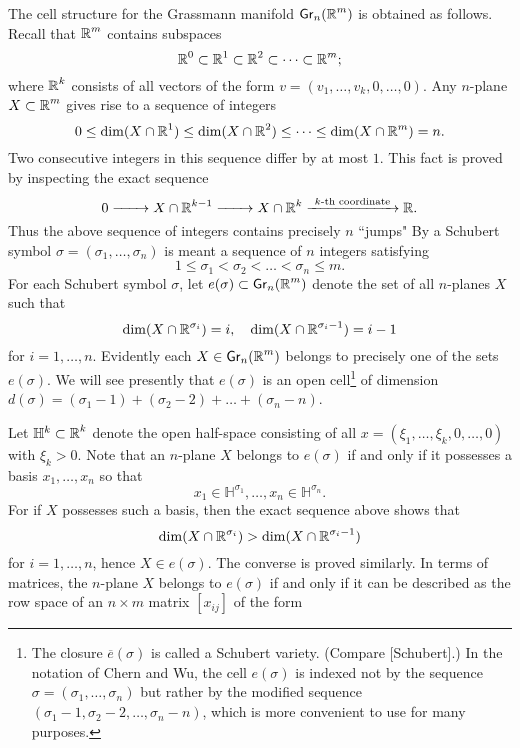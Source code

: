 The cell structure for the Grassmann manifold $\grass{n}{m}$ is obtained as follows. Recall that $\boldsymbol{\mathbb{R}}^m$ contains subspaces
\[
\boldsymbol{\mathbb{R}}^{0} \subset \boldsymbol{\mathbb{R}}^{1} \subset \boldsymbol{\mathbb{R}}^{2} \subset\dots \subset \boldsymbol{\mathbb{R}}^m;
\]
where $\boldsymbol{\mathbb{R}}^{k}$ consists of all vectors of the form $v=(v_{1},\dots, v_{k}, 0,\dots, 0)$. Any $n$-plane $X \subset \boldsymbol{\mathbb{R}}^m$ gives rise to a sequence of integers
\[
0 \leq \dim(X \cap \boldsymbol{\mathbb{R}}^{1}) \leq \dim(X \cap \boldsymbol{\mathbb{R}}^{2}) \leq\dots \leq \dim(X \cap \boldsymbol{\mathbb{R}}^m)=n.
\]
Two consecutive integers in this sequence differ by at most $1$. This fact is proved by inspecting the exact sequence
\[
0 \xrightarrow{\qquad}X \cap \boldsymbol{\mathbb{R}}^{k-1} \xrightarrow{\qquad}X \cap \boldsymbol{\mathbb{R}}^{k}\xrightarrow{\ k\text{-th coordinate }}  \boldsymbol{\mathbb{R}}.
\]
Thus the above sequence of integers contains precisely $n$ ``jumps" By a Schubert symbol $\sigma=(\sigma_{1},\dots, \sigma_{n})$ is meant a sequence of $n$ integers satisfying
\[
1 \leq \sigma_{1}<\sigma_{2}<\dots<\sigma_{n} \leq m.
\]
For each Schubert symbol $\sigma$, let $e(\sigma) \subset \grass{n}{m}$ denote the set of all $n$-planes $X$ such that
\[
\dim(X \cap \boldsymbol{\mathbb{R}}^{\sigma_{i}})=i,\quad \dim(X \cap \boldsymbol{\mathbb{R}}^{\sigma_{i}-1})=i-1
\]
for $i=1,\dots, n$. Evidently each $X \in \grass{n}{m}$ belongs to precisely one of the sets  $e(\sigma)$. We will see presently that $e(\sigma)$ is an open cell\footnote{The closure $\overline{e}(\sigma)$ is called a Schubert variety. (Compare [Schubert].) In the notation of Chern and Wu, the cell $e(\sigma)$ is indexed not by the sequence $\sigma=(\sigma_{1},\dots, \sigma_{n})$ but rather by the modified sequence $(\sigma_{1}-1, \sigma_{2}-2,\dots, \sigma_{n}-n)$, which is more convenient to use for many purposes.} of dimension $d(\sigma)=(\sigma_{1}-1)+(\sigma_{2}-2)+\dots+(\sigma_{n}-n)$.

Let $\mathbb{H}^{k} \subset \boldsymbol{\mathbb{R}}^{k}$ denote the open half-space consisting of all $x= (\xi_{1},\dots, \xi_{k}, 0,\dots, 0)$ with $\xi_{k}>0 $. Note that an $n$-plane $X$ belongs to $e(\sigma)$ if and only if it possesses a basis $x_{1},\dots, x_{n}$ so that
\[
x_{1} \in \mathbb{H}^{\sigma_{1}},\dots, x_{n} \in \mathbb{H}^{\sigma_{n}}.
\]
For if $X$ possesses such a basis, then the exact sequence above shows that
\[
\dim(X \cap \boldsymbol{\mathbb{R}}^{\sigma_{i}})>\dim(X \cap \boldsymbol{\mathbb{R}}^{\sigma_{i}-1})
\]
for $i=1,\dots, n$, hence $X \in e(\sigma) $. The converse is proved similarly. In terms of matrices, the $n$-plane $X$ belongs to $e(\sigma)$ if and only if it can be described as the row space of an $n \times m$ matrix $\left[x_{ij}\right]$ of the form

